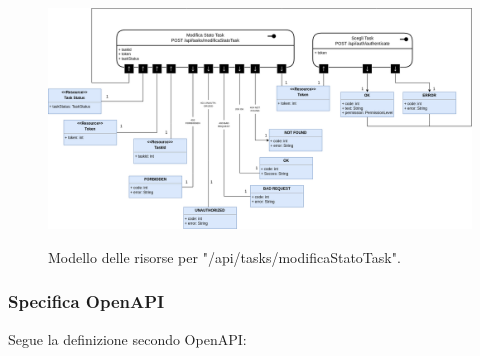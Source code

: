 \documentclass{report}
\begin{document}
\begin{figure}[H]
	\centering\includegraphics[width=1\textwidth]{images/model_modifica_task.png}
	
	Modello delle risorse per "/api/tasks/modificaStatoTask".
\end{figure}

\subsubsection*{Specifica OpenAPI}

Segue la definizione secondo OpenAPI:
\end{document}
